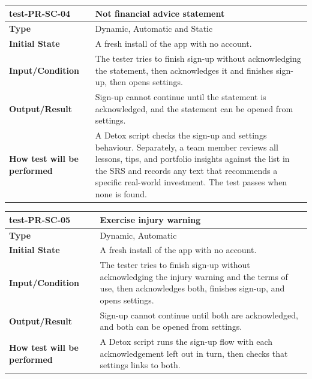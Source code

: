 \documentclass[12pt, titlepage]{article}
\begin{document}
\vspace{1em}

\noindent\begin{tabularx}{\textwidth}{>{\raggedright\arraybackslash}p{3.5cm}X}
  \toprule
  \textbf{test-PR-SC-04} & \textbf{Not financial advice statement}\\
  \midrule
  \textbf{Type} & Dynamic, Automatic and Static\\
  \textbf{Initial State} & A fresh install of the app with no account.\\
  \textbf{Input/Condition} & The tester tries to finish sign-up without acknowledging the statement, then acknowledges it and finishes sign-up, then opens settings.\\
  \textbf{Output/Result} & Sign-up cannot continue until the statement is acknowledged, and the statement can be opened from settings.\\
  \textbf{How test will be performed} & A Detox script checks the sign-up and settings behaviour. Separately, a team member reviews all lessons, tips, and portfolio insights against the list in the SRS and records any text that recommends a specific real-world investment. The test passes when none is found.\\
  \bottomrule
\end{tabularx}

\vspace{1em}

\noindent\begin{tabularx}{\textwidth}{>{\raggedright\arraybackslash}p{3.5cm}X}
  \toprule
  \textbf{test-PR-SC-05} & \textbf{Exercise injury warning}\\
  \midrule
  \textbf{Type} & Dynamic, Automatic\\
  \textbf{Initial State} & A fresh install of the app with no account.\\
  \textbf{Input/Condition} & The tester tries to finish sign-up without acknowledging the injury warning and the terms of use, then acknowledges both, finishes sign-up, and opens settings.\\
  \textbf{Output/Result} & Sign-up cannot continue until both are acknowledged, and both can be opened from settings.\\
  \textbf{How test will be performed} & A Detox script runs the sign-up flow with each acknowledgement left out in turn, then checks that settings links to both.\\
  \bottomrule
\end{tabularx}
\end{document}
